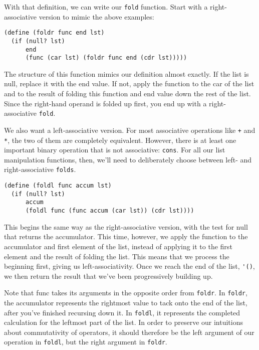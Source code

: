 With that definition, we can write our \verb|fold| function. Start with a right-associative version to mimic the above examples:
 
\begin{lstlisting}
(define (foldr func end lst)
  (if (null? lst)
      end
      (func (car lst) (foldr func end (cdr lst)))))
\end{lstlisting}
 
The structure of this function mimics our definition almost exactly. If the list is null, replace it with the end value. If not, apply the function to the car of the list and to the result of folding this function and end value down the rest of the list. Since the right-hand operand is folded up first, you end up with a right-associative \verb|fold|.
 
We also want a left-associative version. For most associative operations like \lstinline|+| and \lstinline|*|, the two of them are completely equivalent. However, there is at least one important binary operation that is not associative: \verb|cons|. For all our list manipulation functions, then, we'll need to deliberately choose between left- and right-associative \verb|folds|.
 
\begin{lstlisting}
(define (foldl func accum lst)
  (if (null? lst)
      accum
      (foldl func (func accum (car lst)) (cdr lst))))
\end{lstlisting}
 
This begins the same way as the right-associative version, with the test for null that returns the accumulator. This time, however, we apply the function to the accumulator and first element of the list, instead of applying it to the first element and the result of folding the list. This means that we process the beginning first, giving us left-associativity. Once we reach the end of the list, \lstinline|'()|, we then return the result that we've been progressively building up.
 
Note that func takes its arguments in the opposite order from \verb|foldr|. In \verb|foldr|, the accumulator represents the rightmost value to tack onto the end of the list, after you've finished recursing down it. In \verb|foldl|, it represents the completed calculation for the leftmost part of the list. In order to preserve our intuitions about commutativity of operators, it should therefore be the left argument of our operation in \verb|foldl|, but the right argument in \verb|foldr|.
 
